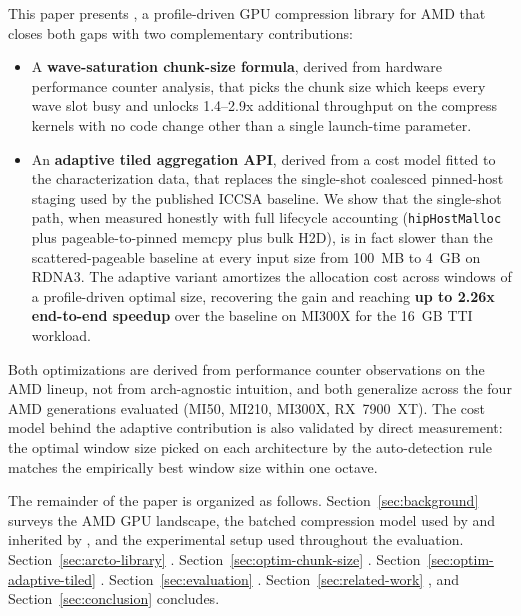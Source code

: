 This paper presents \arcto, a profile-driven GPU compression
library for AMD that closes both gaps with two complementary
contributions:

\begin{itemize}
\item A \textbf{wave-saturation chunk-size formula}, derived from
hardware performance counter analysis, that picks the chunk size
which keeps every wave slot busy and unlocks 1.4--2.9x additional
throughput on the compress kernels with no code change other than
a single launch-time parameter.

\item An \textbf{adaptive tiled aggregation API}, derived from a
cost model fitted to the characterization data, that replaces the
single-shot coalesced pinned-host staging used by the published
ICCSA baseline. We show that the single-shot path, when measured
honestly with full lifecycle accounting (\texttt{hipHostMalloc}
plus pageable-to-pinned memcpy plus bulk H2D), is in fact slower
than the scattered-pageable baseline at every input size from
100~MB to 4~GB on RDNA3. The adaptive variant amortizes the
allocation cost across windows of a profile-driven optimal size,
recovering the gain and reaching \textbf{up to 2.26x end-to-end
speedup} over the baseline on MI300X for the 16~GB TTI workload.
\end{itemize}

Both optimizations are derived from performance counter observations
on the AMD lineup, not from arch-agnostic intuition, and both
generalize across the four AMD generations evaluated (MI50, MI210,
MI300X, RX~7900~XT). The cost model behind the adaptive contribution
is also validated by direct measurement: the optimal window size
picked on each architecture by the auto-detection rule matches the
empirically best window size within one octave.

The remainder of the paper is organized as follows.
Section~\ref{sec:background} surveys the AMD GPU landscape, the
batched compression model used by \nvcomp{} and inherited by
\arcto, and the experimental setup used throughout the evaluation.
Section~\ref{sec:arcto-library} .
Section~\ref{sec:optim-chunk-size} .
Section~\ref{sec:optim-adaptive-tiled} .
Section~\ref{sec:evaluation} .
Section~\ref{sec:related-work} , and Section~\ref{sec:conclusion} concludes.
